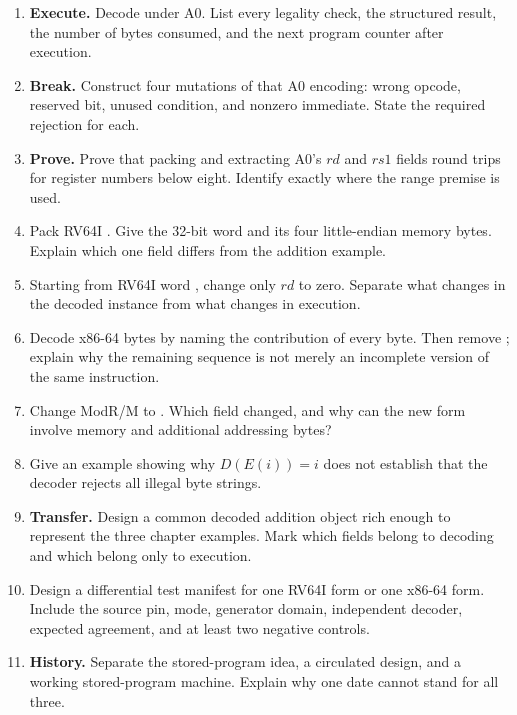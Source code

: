 \begin{enumerate}
\item \textbf{Execute.} Decode  under A0. List every
legality check, the structured result, the number of bytes consumed, and the
next program counter after execution.

\item \textbf{Break.} Construct four mutations of that A0 encoding: wrong
opcode, reserved bit, unused condition, and nonzero immediate. State the
required rejection for each.

\item \textbf{Prove.} Prove that packing and extracting A0's \(rd\) and
\(rs1\) fields round trips for register numbers below eight. Identify exactly
where the range premise is used.

\item Pack RV64I . Give the 32-bit word and its four
little-endian memory bytes. Explain which one field differs from the addition
example.

\item Starting from RV64I word , change only \(rd\) to zero.
Separate what changes in the decoded instance from what changes in execution.

\item Decode x86-64 bytes  by naming the contribution of every
byte. Then remove ; explain why the remaining sequence is not merely
an incomplete version of the same instruction.

\item Change ModR/M  to . Which field changed, and why can
the new form involve memory and additional addressing bytes?

\item Give an example showing why \(D(E(i))=i\) does not establish that the
decoder rejects all illegal byte strings.

\item \textbf{Transfer.} Design a common decoded addition object rich enough
to represent the three chapter examples. Mark which fields belong to decoding
and which belong only to execution.

\item Design a differential test manifest for one RV64I form or one x86-64
form. Include the source pin, mode, generator domain, independent decoder,
expected agreement, and at least two negative controls.

\item \textbf{History.} Separate the stored-program idea, a circulated design,
and a working stored-program machine. Explain why one date cannot stand for all
three.


\end{enumerate}
